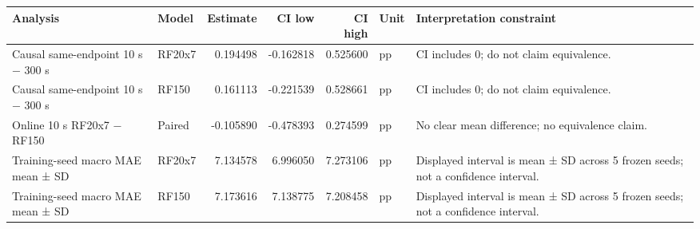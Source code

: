 \begin{tabular}{llrrrll}
\toprule
Analysis & Model & Estimate & CI low & CI high & Unit & Interpretation constraint \\
\midrule
Causal same-endpoint 10 s − 300 s & RF20x7 & 0.194498 & -0.162818 & 0.525600 & pp & CI includes 0; do not claim equivalence. \\
Causal same-endpoint 10 s − 300 s & RF150 & 0.161113 & -0.221539 & 0.528661 & pp & CI includes 0; do not claim equivalence. \\
Online 10 s RF20x7 − RF150 & Paired & -0.105890 & -0.478393 & 0.274599 & pp & No clear mean difference; no equivalence claim. \\
Training-seed macro MAE mean ± SD & RF20x7 & 7.134578 & 6.996050 & 7.273106 & pp & Displayed interval is mean ± SD across 5 frozen seeds; not a confidence interval. \\
Training-seed macro MAE mean ± SD & RF150 & 7.173616 & 7.138775 & 7.208458 & pp & Displayed interval is mean ± SD across 5 frozen seeds; not a confidence interval. \\
\bottomrule
\end{tabular}
